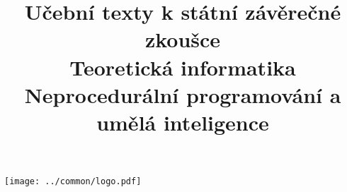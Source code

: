 \clearpage

\clearpage

\title{\LARGE Učební texty k státní závěrečné zkoušce \\ Teoretická informatika \\ Neprocedurální programování a umělá inteligence}




\maketitle

\vspace{10mm}
\begin{center}
\texttt{[image: ../common/logo.pdf]}
\end{center} 

\clearpage

\clearpage

\tableofcontents








